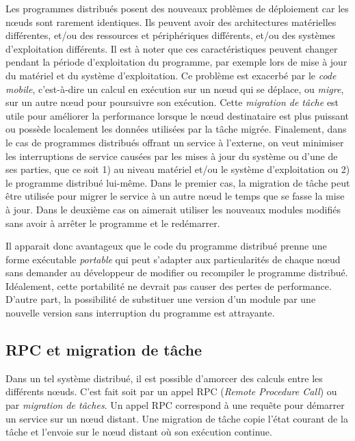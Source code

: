 Les programmes distribués posent des nouveaux problèmes de déploiement
car les nœuds sont rarement identiques.  Ils peuvent avoir des
architectures matérielles différentes, et/ou des ressources et
périphériques différents, et/ou des systèmes d'exploitation
différents.  Il est à noter que ces caractéristiques peuvent changer
pendant la période d'exploitation du programme, par exemple lors de
mise à jour du matériel et du système d'exploitation.  Ce problème est
exacerbé par le \textit{code mobile}, c'est-à-dire un calcul en
exécution sur un nœud qui se déplace, ou \textit{migre}, sur un autre
nœud pour poursuivre son exécution.  Cette \textit{migration de
  tâche} est utile pour améliorer la performance lorsque le nœud
destinataire est plus puissant ou possède localement les données
utilisées par la tâche migrée.  Finalement, dans le cas de programmes
distribués offrant un service à l'externe, on veut minimiser les
interruptions de service causées par les mises à jour du système ou
d'une de ses parties, que ce soit 1) au niveau matériel et/ou le
système d'exploitation ou 2) le programme distribué lui-même.  Dans le
premier cas, la migration de tâche peut être utilisée pour migrer le
service à un autre nœud le temps que se fasse la mise à jour.  Dans
le deuxième cas on aimerait utiliser les nouveaux modules
modifiés sans avoir à arrêter le programme et le redémarrer.

Il apparait donc avantageux que le code du programme distribué prenne
une forme exécutable \textit{portable} qui peut s'adapter aux
particularités de chaque nœud sans demander au développeur de
modifier ou recompiler le programme distribué.  Idéalement, cette
portabilité ne devrait pas causer des pertes de performance.  D'autre
part, la possibilité de substituer une version d'un module par une
nouvelle version sans interruption du programme est attrayante.

\subsection{RPC et migration de tâche}

Dans un tel système distribué, il est possible d'amorcer des calculs entre les
différents nœuds. C'est fait soit par un appel RPC (\textit{Remote
Procedure Call}) ou par \textit{migration de tâches}.  Un appel RPC correspond
à une requête pour démarrer un service sur un nœud distant. Une migration de
tâche copie l'état courant de la tâche et l'envoie sur le nœud distant où son
exécution continue.

